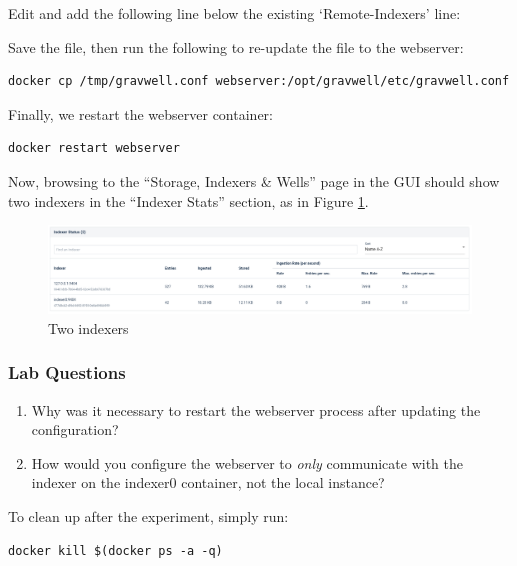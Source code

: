 Edit  and add the following line below the existing `Remote-Indexers' line:


Save the file, then run the following to re-update the file to the webserver:

\begin{Verbatim}[breaklines=true]
docker cp /tmp/gravwell.conf webserver:/opt/gravwell/etc/gravwell.conf
\end{Verbatim}

Finally, we restart the webserver container:

\begin{Verbatim}[breaklines=true]
docker restart webserver
\end{Verbatim}

Now, browsing to the ``Storage, Indexers \& Wells'' page in the GUI should show
two indexers in the ``Indexer Stats'' section, as in Figure \ref{fig:twoindexers}.

\begin{figure}
	\includegraphics{images/twoindexers.png}
	\caption{Two indexers}
	\label{fig:twoindexers}
\end{figure}

\subsubsection{Lab Questions}

\begin{enumerate}
\item
  Why was it necessary to restart the webserver process after updating
  the configuration?
\item
  How would you configure the webserver to \emph{only} communicate with
  the indexer on the indexer0 container, not the local instance?
\end{enumerate}

To clean up after the experiment, simply run:

\begin{Verbatim}[breaklines=true]
docker kill $(docker ps -a -q)
\end{Verbatim}

